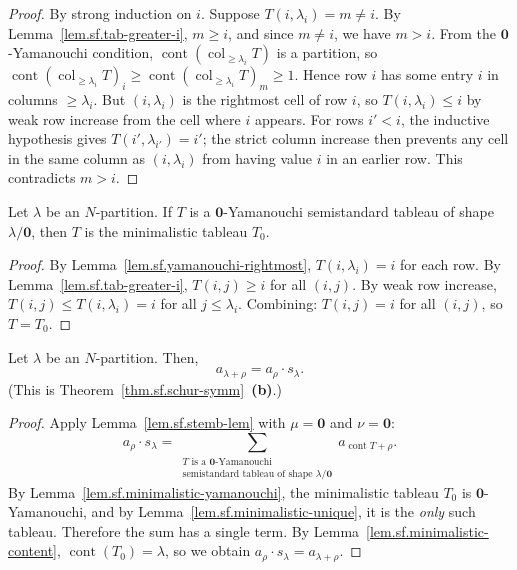 \begin{proof}
\leanok
By strong induction on $i$. Suppose $T(i, \lambda_i) = m \neq i$.
By Lemma~\ref{lem.sf.tab-greater-i}, $m \geq i$, and since $m \neq i$, we have $m > i$.
From the $\mathbf{0}$-Yamanouchi condition,
$\operatorname{cont}(\operatorname{col}_{\geq \lambda_i} T)$ is a partition,
so $\operatorname{cont}(\operatorname{col}_{\geq \lambda_i} T)_i
\geq \operatorname{cont}(\operatorname{col}_{\geq \lambda_i} T)_m \geq 1$.
Hence row $i$ has some entry $i$ in columns $\geq \lambda_i$.
But $(i, \lambda_i)$ is the rightmost cell of row $i$, so
$T(i, \lambda_i) \leq i$ by weak row increase from the cell where $i$ appears.
For rows $i' < i$, the inductive hypothesis gives $T(i', \lambda_{i'}) = i'$;
the strict column increase then prevents any cell in the same column as
$(i, \lambda_i)$ from having value $i$ in an earlier row.
This contradicts $m > i$.
\end{proof}

\begin{lemma}
\label{lem.sf.minimalistic-unique}
\leanhelper
\leanok
Let $\lambda$ be an $N$-partition. If $T$ is a $\mathbf{0}$-Yamanouchi
semistandard tableau of shape $\lambda/\mathbf{0}$, then $T$ is the
minimalistic tableau $T_0$.
\end{lemma}

\begin{proof}
\leanok
By Lemma~\ref{lem.sf.yamanouchi-rightmost}, $T(i, \lambda_i) = i$ for each row.
By Lemma~\ref{lem.sf.tab-greater-i}, $T(i, j) \geq i$ for all $(i, j)$.
By weak row increase, $T(i, j) \leq T(i, \lambda_i) = i$ for all $j \leq \lambda_i$.
Combining: $T(i, j) = i$ for all $(i, j)$, so $T = T_0$.
\end{proof}

\begin{lemma}
\label{lem.sf.schur-alternant}
\leanhelper
\leanok
Let $\lambda$ be an $N$-partition. Then,
\[
a_{\lambda + \rho} = a_{\rho} \cdot s_{\lambda}.
\]
(This is Theorem~\ref{thm.sf.schur-symm}~\textbf{(b)}.)
\end{lemma}

\begin{proof}
\leanok
Apply Lemma~\ref{lem.sf.stemb-lem} with $\mu = \mathbf{0}$ and
$\nu = \mathbf{0}$:
\[
a_{\rho} \cdot s_{\lambda}
= \sum_{\substack{T \text{ is a } \mathbf{0}\text{-Yamanouchi} \\
    \text{semistandard tableau of shape } \lambda/\mathbf{0}}}
  a_{\operatorname{cont} T + \rho}.
\]
By Lemma~\ref{lem.sf.minimalistic-yamanouchi}, the minimalistic tableau $T_0$
is $\mathbf{0}$-Yamanouchi, and by Lemma~\ref{lem.sf.minimalistic-unique},
it is the \emph{only} such tableau. Therefore the sum has a single term.
By Lemma~\ref{lem.sf.minimalistic-content},
$\operatorname{cont}(T_0) = \lambda$, so we obtain
$a_{\rho} \cdot s_{\lambda} = a_{\lambda + \rho}$.
\end{proof}

